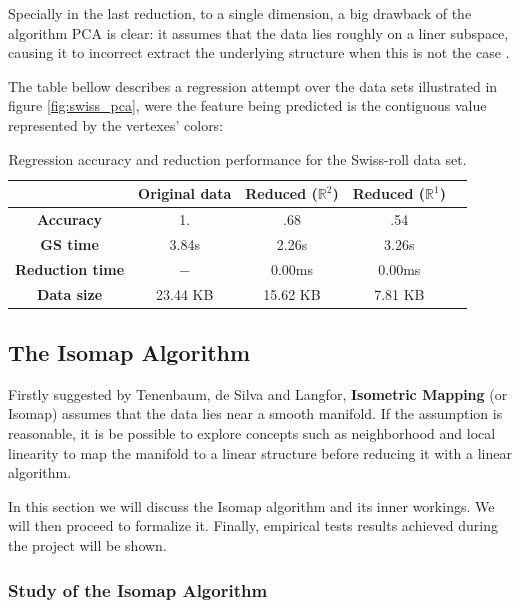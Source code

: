 \documentclass[12pt]{article}
\begin{document}
Specially in the last reduction, to a single dimension, a big drawback of the algorithm PCA is clear: it assumes that the data lies roughly on a liner subspace, causing it to incorrect extract the underlying structure when this is not the case \cite{cay2005}.

The table bellow describes a regression attempt over the data sets illustrated in figure \ref{fig:swiss_pca}, were the feature being predicted is the contiguous value represented by the vertexes' colors:

\begin{table}[H]
	\centering
	\begin{tabular}{|c|c|c|c|c|}
		\hline
		& \textbf{Original data} & \textbf{Reduced ($\mathbb{R}^2$)} & \textbf{Reduced ($\mathbb{R}^1$)} \\\hline
		\textbf{Accuracy}  & 1.       & .68       & .54 \\\hline
		\textbf{GS time}    & 3.84s  & 2.26s   & 3.26s \\\hline
		\textbf{Reduction time}    & $-$     & 0.00ms & 0.00ms \\\hline
		\textbf{Data size} & 23.44 KB & 15.62 KB  & 7.81 KB \\\hline
	\end{tabular}

	\caption{Regression accuracy and reduction performance for the Swiss-roll data set.}
\end{table}

\subsection{The Isomap Algorithm}

Firstly suggested by Tenenbaum, de Silva and Langfor, \textbf{Isometric Mapping} (or Isomap) assumes that the data lies near a smooth manifold. If the assumption is reasonable, it is be possible to explore concepts such as neighborhood and local linearity to map the manifold to a linear structure before reducing it with a linear algorithm.

In this section we will discuss the Isomap algorithm and its inner workings. We will then proceed to formalize it. Finally, empirical tests results achieved during the project will be shown.

\subsubsection{Study of the Isomap Algorithm}
\end{document}
